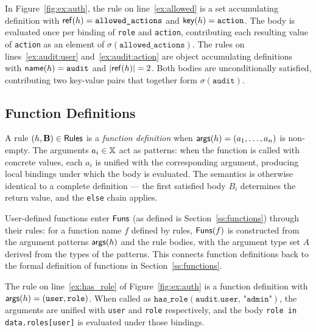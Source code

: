 \begin{example}
  In Figure~\ref{fig:ex:auth}, the rule on line~\ref{ex:allowed} is a set accumulating
  definition with $\mathsf{ref}(h) = \texttt{allowed\_actions}$ and $\mathsf{key}(h) = \texttt{action}$.
  The body is evaluated once per binding of \texttt{role} and \texttt{action},
  contributing each resulting value of \texttt{action} as an element of
  $\sigma(\texttt{allowed\_actions})$.
  The rules on lines~\ref{ex:audit:user} and~\ref{ex:audit:action} are object accumulating
  definitions with $\mathsf{name}(h) = \texttt{audit}$ and $|\mathsf{ref}(h)| = 2$.
  Both bodies are unconditionally satisfied, contributing two key-value pairs that
  together form $\sigma(\texttt{audit})$.
\end{example}

\subsection{Function Definitions}
\label{ss:fun-rules}


A rule $(h, \mathbf{B}) \in \mathsf{Rules}$ is a \emph{function definition} when $\mathsf{args}(h) = (a_1, \ldots, a_n)$
is non-empty.
The arguments $a_i \in \mathbb{X}$ act as patterns: when the function is called with concrete
values, each $a_i$ is unified with the corresponding argument, producing local bindings
under which the body is evaluated.
The semantics is otherwise identical to a complete definition — the first satisfied body
$B_i$ determines the return value, and the \texttt{else} chain applies.

User-defined functions enter $\mathsf{Funs}$ (as defined is Section~\ref{ss:functions}) through their rules: for a function name $f$
defined by rules, $\mathsf{Funs}(f)$ is constructed from the argument patterns $\mathsf{args}(h)$
and the rule bodies, with the argument type set $A$ derived from the types of the patterns.
This connects function definitions back to the formal definition of functions in
Section~\ref{ss:functions}.

\begin{example}
  The rule on line~\ref{ex:has_role} of Figure~\ref{fig:ex:auth} is a function definition
  with $\mathsf{args}(h) = (\texttt{user}, \texttt{role})$.
  When called as $\texttt{has\_role}(\texttt{audit.user},\, \texttt{"admin"})$,
  the arguments are unified with \texttt{user} and \texttt{role} respectively,
  and the body \texttt{role in data.roles[user]} is evaluated under those bindings.
\end{example}

